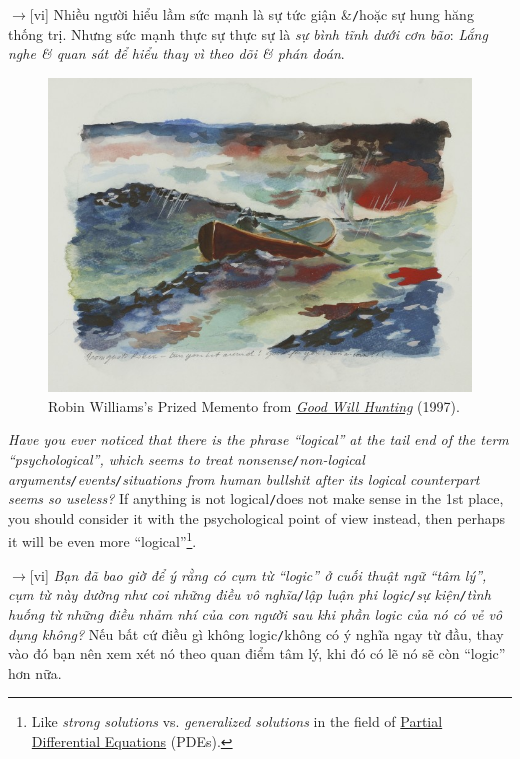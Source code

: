 \documentclass[12pt,oneside]{book}
\begin{document}
{\sf[en]$\to$[vi]} Nhiều người hiểu lầm sức mạnh là sự tức giận \&{\tt/}hoặc sự hung hăng thống trị. Nhưng sức mạnh thực sự thực sự là {\it sự bình tĩnh dưới cơn bão}: {\it Lắng nghe \& quan sát để hiểu thay vì theo dõi \& phán đoán}.

\begin{figure}[H]
	\centering
	\includegraphics[width = 12cm]{boat_under_storm}
	\caption{{\sc Robin Williams}'s Prized Memento from \href{https://www.imdb.com/title/tt0119217}{\it Good Will Hunting} (1997).}
	\label{fig6}
\end{figure}
{\it Have you ever noticed that there is the phrase ``logical'' at the tail end of the term ``psychological'', which seems to treat nonsense{\tt/}non-logical arguments{\tt/}events{\tt/}situations from human bullshit after its logical counterpart seems so useless?} If anything is not logical{\tt/}does not make sense in the 1st place, you should consider it with the psychological point of view instead, then perhaps it will be even more ``logical''\footnote{Like {\it strong solutions} vs. {\it generalized solutions} in the field of \href{https://en.wikipedia.org/wiki/Partial_differential_equation}{Partial Differential Equations} (PDEs).}.

{\sf[en]$\to$[vi]} {\it Bạn đã bao giờ để ý rằng có cụm từ ``logic'' ở cuối thuật ngữ ``tâm lý'', cụm từ này dường như coi những điều vô nghĩa{\tt/}lập luận phi logic{\tt/}sự kiện{\tt/}tình huống từ những điều nhảm nhí của con người sau khi phần logic của nó có vẻ vô dụng không?} Nếu bất cứ điều gì không logic{\tt/}không có ý nghĩa ngay từ đầu, thay vào đó bạn nên xem xét nó theo quan điểm tâm lý, khi đó có lẽ nó sẽ còn ``logic'' hơn nữa.
\end{document}
